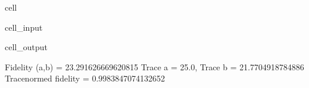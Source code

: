 \documentclass[letterpaper,table,10pt,english]{jupyterBook}
\begin{document}
\begin{sphinxuseclass}{cell}\begin{sphinxVerbatimInput}

\begin{sphinxuseclass}{cell_input}
\begin{sphinxVerbatim}[commandchars=\\\{\}]
\end{sphinxVerbatim}

\end{sphinxuseclass}\end{sphinxVerbatimInput}
\begin{sphinxVerbatimOutput}

\begin{sphinxuseclass}{cell_output}
\begin{sphinxVerbatim}[commandchars=\\\{\}]
Fidelity (a,b) = 23.291626669620815
Trace a = 25.0, Trace b = 21.7704918784886
Trace\PYGZhy{}normed fidelity = 0.9983847074132652
\end{sphinxVerbatim}

\end{sphinxuseclass}\end{sphinxVerbatimOutput}

\end{sphinxuseclass}
\end{document}
